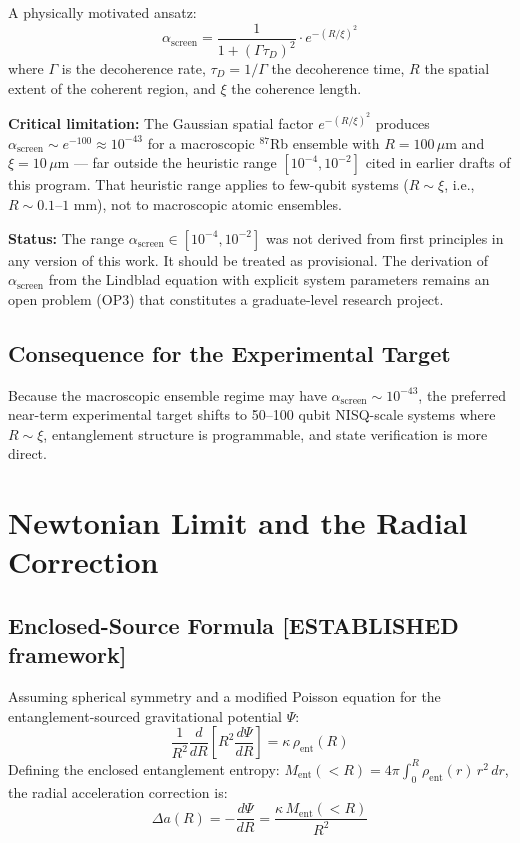 \documentclass[12pt,letterpaper]{article}
\theoremstyle{plain}
\theoremstyle{definition}
\theoremstyle{remark}
\newcommand{\ascreen}{\alpha_{\mathrm{screen}}}
\begin{document}
A physically motivated ansatz:
\begin{equation}
  \ascreen = \frac{1}{1+(\Gamma\tau_D)^2}\cdot e^{-(R/\xi)^2}
  \tag{A4.2}
  \label{eq:alpha_screen}
\end{equation}
where $\Gamma$ is the decoherence rate, $\tau_D = 1/\Gamma$ the
decoherence time, $R$ the spatial extent of the coherent region, and
$\xi$ the coherence length.

\textbf{Critical limitation:} The Gaussian spatial factor
$e^{-(R/\xi)^2}$ produces $\ascreen \sim e^{-100} \approx 10^{-43}$
for a macroscopic $^{87}$Rb ensemble with $R = 100\,\mu$m and
$\xi = 10\,\mu$m --- far outside the heuristic range
$[10^{-4}, 10^{-2}]$ cited in earlier drafts of this program.
That heuristic range applies to few-qubit systems ($R \sim \xi$,
i.e., $R \sim 0.1$--$1$ mm), not to macroscopic atomic ensembles.

\textbf{Status:} The range $\ascreen\in[10^{-4},10^{-2}]$ was not
derived from first principles in any version of this work. It should
be treated as provisional. The derivation of $\ascreen$ from the
Lindblad equation with explicit system parameters remains an open
problem (OP3) that constitutes a graduate-level research project.

\subsection{Consequence for the Experimental Target}

Because the macroscopic ensemble regime may have $\ascreen \sim 10^{-43}$,
the preferred near-term experimental target shifts to 50--100 qubit
NISQ-scale systems where $R\sim\xi$, entanglement structure is
programmable, and state verification is more direct.

\section{Newtonian Limit and the Radial Correction}
\label{sec:newtonian_limit}

\subsection{Enclosed-Source Formula \textcolor{blue!70!black}{[ESTABLISHED framework]}}

Assuming spherical symmetry and a modified Poisson equation for the
entanglement-sourced gravitational potential $\Psi$:
\begin{equation}
  \frac{1}{R^2}\frac{d}{dR}\!\left[R^2\frac{d\Psi}{dR}\right]
  = \kappa\,\rho_{\mathrm{ent}}(R)
  \tag{A5.1}
\end{equation}
Defining the enclosed entanglement entropy:
$M_{\mathrm{ent}}(<R) = 4\pi\int_0^R \rho_{\mathrm{ent}}(r)\,r^2\,dr$,
the radial acceleration correction is:
\begin{equation}
  \Delta a(R) = -\frac{d\Psi}{dR}
  = \frac{\kappa\,M_{\mathrm{ent}}(<R)}{R^2}
  \tag{A5.2}
  \label{eq:delta_a}
\end{equation}
\end{document}
